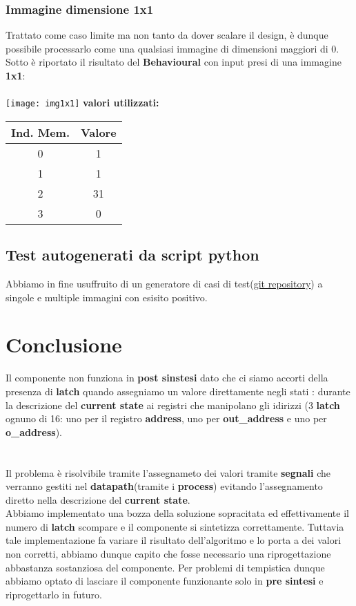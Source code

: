 \documentclass[a4paper, 12pt]{report}
\begin{document}
			\subsection{Immagine dimensione 1x1}
				Trattato come caso limite ma non tanto da dover scalare il design, è dunque possibile processarlo come una qualsiasi immagine di dimensioni maggiori di 0.
				Sotto è riportato il risultato del \textbf{Behavioural} con input presi di una immagine \textbf{1x1}:\\\\
					\texttt{[image: img1x1]}
					\textbf{valori utilizzati:}\\
						\begin{center}
						\begin{tabular}{|c | c|}
					 		\hline Ind. Mem. & Valore \\ \hline 
								0 & 1\\ \hline
								1 & 1\\ \hline
								2 & 31\\ \hline
								3 & 0\\ \hline
						\end{tabular}
						\end{center}
		\section{Test autogenerati da script python}
			Abbiamo in fine usuffruito di un generatore di casi di test(\href{https://github.com/davidemerli/RL-generator-2020-2021}{git repository}) a singole e multiple immagini con esisito positivo. 
	\chapter{Conclusione}
			Il componente non funziona in \textbf{post sinstesi} dato che ci siamo accorti della presenza di \textbf{latch} quando assegniamo un valore direttamente negli
			stati :
				durante la descrizione del \textbf{current state} ai registri che manipolano gli idirizzi (3 \textbf{latch} ognuno di 16: uno per il registro \textbf{address}, uno per \textbf{out\_address} e uno per \textbf{o\_address}).\\\\\\
			Il problema è risolvibile tramite l'assegnameto dei valori tramite \textbf{segnali} che verranno gestiti nel \textbf{datapath}(tramite i \textbf{process}) evitando 
			l'assegnamento diretto nella descrizione del \textbf{current state}.\\ Abbiamo implementato una bozza della soluzione sopracitata ed effettivamente il numero di \textbf{latch} scompare e il componente si sintetizza
			correttamente. Tuttavia tale implementazione fa variare il risultato dell'algoritmo e lo porta a dei valori non corretti, abbiamo dunque capito che fosse necessario una riprogettazione abbastanza sostanziosa del
			componente. Per problemi di tempistica dunque abbiamo optato di lasciare il componente funzionante solo in \textbf{pre sintesi} e riprogettarlo in futuro.
\end{document}
